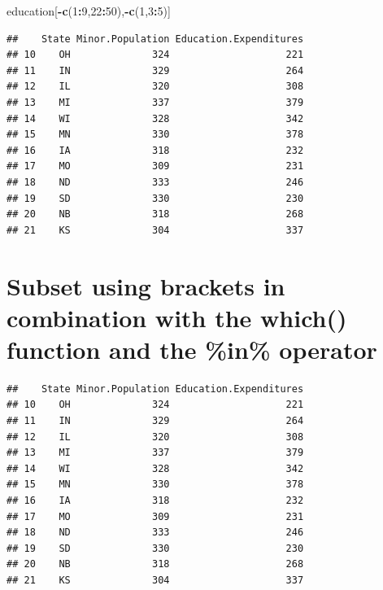 \documentclass[]{book}
\newenvironment{Shaded}{\begin{snugshade}}{\end{snugshade}}
\newcommand{\DecValTok}[1]{\textcolor[rgb]{0.00,0.00,0.81}{#1}}
\newcommand{\KeywordTok}[1]{\textcolor[rgb]{0.13,0.29,0.53}{\textbf{#1}}}
\newcommand{\NormalTok}[1]{#1}
\newcommand{\OperatorTok}[1]{\textcolor[rgb]{0.81,0.36,0.00}{\textbf{#1}}}
\newcommand{\StringTok}[1]{\textcolor[rgb]{0.31,0.60,0.02}{#1}}
\begin{document}
\begin{Shaded}
\begin{Highlighting}[]
\NormalTok{education[}\OperatorTok{-}\KeywordTok{c}\NormalTok{(}\DecValTok{1}\OperatorTok{:}\DecValTok{9}\NormalTok{,}\DecValTok{22}\OperatorTok{:}\DecValTok{50}\NormalTok{),}\OperatorTok{-}\KeywordTok{c}\NormalTok{(}\DecValTok{1}\NormalTok{,}\DecValTok{3}\OperatorTok{:}\DecValTok{5}\NormalTok{)]}
\end{Highlighting}
\end{Shaded}

\begin{verbatim}
##    State Minor.Population Education.Expenditures
## 10    OH              324                    221
## 11    IN              329                    264
## 12    IL              320                    308
## 13    MI              337                    379
## 14    WI              328                    342
## 15    MN              330                    378
## 16    IA              318                    232
## 17    MO              309                    231
## 18    ND              333                    246
## 19    SD              330                    230
## 20    NB              318                    268
## 21    KS              304                    337
\end{verbatim}

\hypertarget{subset-using-brackets-in-combination-with-the-which-function-and-the-in-operator}{%
\section{Subset using brackets in combination with the which() function and the \%in\% operator}\label{subset-using-brackets-in-combination-with-the-which-function-and-the-in-operator}}

\begin{Shaded}
\end{Shaded}

\begin{verbatim}
##    State Minor.Population Education.Expenditures
## 10    OH              324                    221
## 11    IN              329                    264
## 12    IL              320                    308
## 13    MI              337                    379
## 14    WI              328                    342
## 15    MN              330                    378
## 16    IA              318                    232
## 17    MO              309                    231
## 18    ND              333                    246
## 19    SD              330                    230
## 20    NB              318                    268
## 21    KS              304                    337
\end{verbatim}
\end{document}
